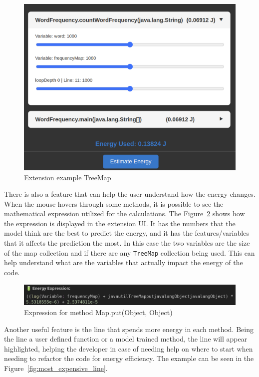 \begin{figure}[htbp]
  \centering
  \includegraphics[width = .8 \textwidth]{figures/extension_example2.png}
  \caption{Extension example TreeMap}
  \label{fig:extension_example2}
\end{figure}

There is also a feature that can help the user understand how the energy changes. When the mouse hovers through some methods, it is possible to see the mathematical expression utilized for the calculations. The Figure~\ref{fig:extension_expression_example} shows how the expression is displayed in the extension UI. It has the numbers that the model think are the best to predict the energy, and it has the features/variables that it affects the prediction the most. In this case the two variables are the size of the map collection and if there are any \texttt{TreeMap} collection being used. This can help understand what are the variables that actually impact the energy of the code. 


\begin{figure}[htbp]
  \centering
  \includegraphics[width = .8 \textwidth]{figures/extension_expression_example.png}
  \caption{Expression for method Map.put(Object, Object)}
  \label{fig:extension_expression_example}
\end{figure}

{\color{blue}
Another useful feature is the line that spends more energy in each method. Being the line a user defined function or a model trained method, the line will appear highlighted, helping the developer in case of needing help on where to start when needing to refactor the code for energy efficiency. The example can be seen in the Figure~\ref{fig:most_expensive_line}.}

